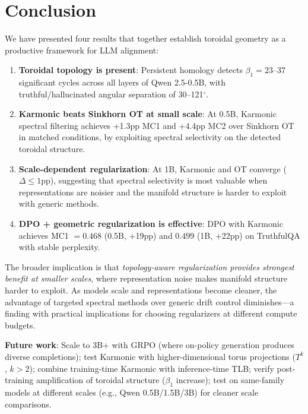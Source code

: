 \documentclass[11pt,a4paper]{article}
\begin{document}
\section{Conclusion}

We have presented four results that together establish toroidal geometry as a productive framework for LLM alignment:

\begin{enumerate}
    \item \textbf{Toroidal topology is present}: Persistent homology detects $\beta_1 = 23$--$37$ significant cycles across all layers of Qwen 2.5-0.5B, with truthful/hallucinated angular separation of 30--121$^\circ$.
    \item \textbf{Karmonic beats Sinkhorn OT at small scale}: At 0.5B, Karmonic spectral filtering achieves +1.3pp MC1 and +4.4pp MC2 over Sinkhorn OT in matched conditions, by exploiting spectral selectivity on the detected toroidal structure.
    \item \textbf{Scale-dependent regularization}: At 1B, Karmonic and OT converge ($\Delta \leq 1$pp), suggesting that spectral selectivity is most valuable when representations are noisier and the manifold structure is harder to exploit with generic methods.
    \item \textbf{DPO + geometric regularization is effective}: DPO with Karmonic achieves MC1 $= 0.468$ (0.5B, +19pp) and $0.499$ (1B, +22pp) on TruthfulQA with stable perplexity.
\end{enumerate}

The broader implication is that \emph{topology-aware regularization provides strongest benefit at smaller scales}, where representation noise makes manifold structure harder to exploit. As models scale and representations become cleaner, the advantage of targeted spectral methods over generic drift control diminishes---a finding with practical implications for choosing regularizers at different compute budgets.

\textbf{Future work}: Scale to 3B+ with GRPO (where on-policy generation produces diverse completions); test Karmonic with higher-dimensional torus projections ($T^k$, $k > 2$); combine training-time Karmonic with inference-time TLB; verify post-training amplification of toroidal structure ($\beta_1$ increase); test on same-family models at different scales (e.g., Qwen 0.5B/1.5B/3B) for cleaner scale comparisons.
\end{document}
